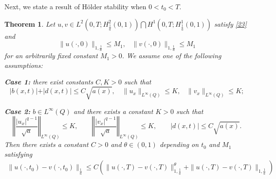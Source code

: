 \documentclass[reqno]{amsart}
\theoremstyle{plain}
\newtheorem{theorem}{Theorem}[section]
\theoremstyle{remark}
\numberwithin{equation}{section}
\begin{document}
Next, we state a result of H\"older stability when $0<t_{0}<T$.
\begin{theorem}\label{stabHJ} Let $u,v  \in L^2\left(0,T;H^2_{\frac{1}{a}}(0,1)\right)\bigcap H^1\left(0,T; H^1_{\frac{1}{a}}(0,1)\right)$ satisfy \eqref{23} and 
    $$\| u(\cdot,0)\|_{1,\frac{1}{a}}\leqslant M_1, \;\;\;\| v(\cdot,0)\|_{1,\frac{1}{a}}\leqslant M_1$$
for an arbitrarily fixed constant \( M_1 > 0 \). We assume one of the following assumptions:

{\bf Case 1:}  there exist constants $C, K>0$ such that
$$\vert b(x,t)\vert +\vert d(x,t)\vert\leqslant C \sqrt{a(x)}, \quad \| u_{x}\|_{L^{\infty}(Q)}\leqslant K, \;\;\; \| v_{x}\|_{L^{\infty}(Q)}\leqslant K;$$

{\bf Case 2:} $b \in L^{\infty}(Q)$  and there exists a constant $K>0$ such that
$$\left\Vert \dfrac{\vert u_{x}\vert^{q-1}}{\sqrt{a}}\right\Vert_{L^{\infty}(Q)}\leqslant K, \qquad \left\Vert \dfrac{\vert v_{x}\vert^{q-1}}{\sqrt{a}}\right\Vert_{L^{\infty}(Q)}\leqslant K,\qquad \vert d(x,t)\vert\leqslant C \sqrt{a(x)}.$$
Then there exists a constant $C>0$ and $\theta \in (0,1)$ depending on $t_{0}$ and $M_1$ satisfying
\begin{align*}
    \| u(\cdot,t_{0})-v(\cdot,t_{0})\|_{\frac{1}{a}}\leqslant C\left( \| u(\cdot,T)-v(\cdot,T)\|^{\theta}_{1,\frac{1}{a}}+\| u(\cdot,T)-v(\cdot,T)\|_{1,\frac{1}{a}}\right)
\end{align*}
\end{theorem}
\end{document}
